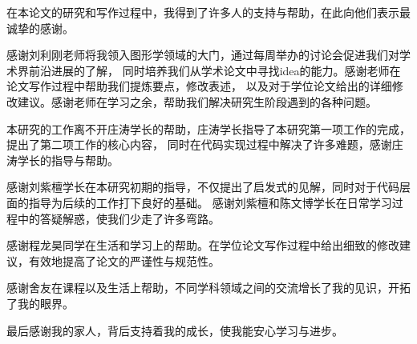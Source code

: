 
\begin{acknowledgements}

在本论文的研究和写作过程中，我得到了许多人的支持与帮助，在此向他们表示最诚挚的感谢。

感谢刘利刚老师将我领入图形学领域的大门，通过每周举办的讨论会促进我们对学术界前沿进展的了解，
同时培养我们从学术论文中寻找idea的能力。感谢老师在论文写作过程中帮助我们提炼要点，修改表述，
以及对于学位论文给出的详细修改建议。感谢老师在学习之余，帮助我们解决研究生阶段遇到的各种问题。

本研究的工作离不开庄涛学长的帮助，庄涛学长指导了本研究第一项工作的完成，提出了第二项工作的核心内容，
同时在代码实现过程中解决了许多难题，感谢庄涛学长的指导与帮助。

感谢刘紫檀学长在本研究初期的指导，不仅提出了启发式的见解，同时对于代码层面的指导为后续的工作打下良好的基础。
感谢刘紫檀和陈文博学长在日常学习过程中的答疑解惑，使我们少走了许多弯路。

感谢程龙昊同学在生活和学习上的帮助。在学位论文写作过程中给出细致的修改建议，有效地提高了论文的严谨性与规范性。

感谢舍友在课程以及生活上帮助，不同学科领域之间的交流增长了我的见识，开拓了我的眼界。

最后感谢我的家人，背后支持着我的成长，使我能安心学习与进步。



\end{acknowledgements}
